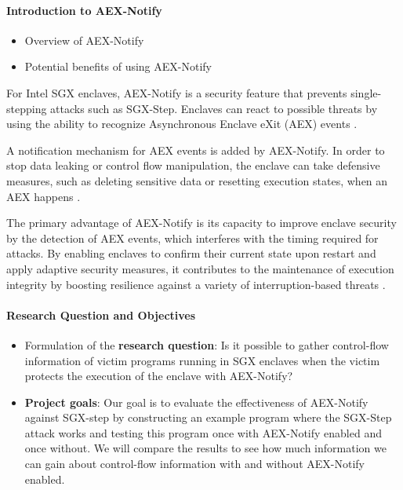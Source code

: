 \documentclass{llncs}
\begin{document}
\paragraph{Introduction to AEX-Notify}
\begin{itemize}
  \item Overview of AEX-Notify
  \item Potential benefits of using AEX-Notify
\end{itemize}

For Intel SGX enclaves, AEX-Notify is a security feature that prevents single-stepping attacks such as SGX-Step. Enclaves can react to possible threats by using the ability to recognize Asynchronous Enclave eXit (AEX) events \cite{ConstableBCXXAK23}.

A notification mechanism for AEX events is added by AEX-Notify. In order to stop data leaking or control flow manipulation, the enclave can take defensive measures, such as deleting sensitive data or resetting execution states, when an AEX happens \cite{ConstableBCXXAK23}.

The primary advantage of AEX-Notify is its capacity to improve enclave security by the detection of AEX events, which interferes with the timing required for attacks. By enabling enclaves to confirm their current state upon restart and apply adaptive security measures, it contributes to the maintenance of execution integrity by boosting resilience against a variety of interruption-based threats \cite{ConstableBCXXAK23}.

\paragraph{Research Question and Objectives}
\begin{itemize}
  \item Formulation of the \textbf{research question}:
    Is it possible to gather control-flow information of victim programs running
    in SGX enclaves when the victim protects the execution of the enclave with
    AEX-Notify?
  \item \textbf{Project goals}:
    Our goal is to evaluate the effectiveness of AEX-Notify against SGX-step by
    constructing an example program where the SGX-Step attack works and testing
    this program once with AEX-Notify enabled and once without. We will compare
    the results to see how much information we can gain about control-flow
    information with and without AEX-Notify enabled.
\end{itemize}
\end{document}
